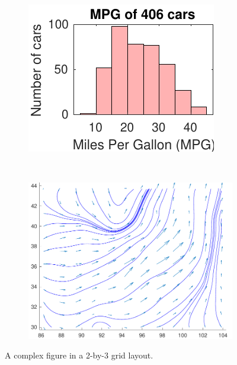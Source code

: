 \begin{figure}[H]
		\hfill
		\begin{subfigure}[b]{\threefig\textwidth}
			\centering
			\includegraphics{../matlab/fig/examples/hist-with-ffsp.pdf}
		\end{subfigure}
		\\
		\begin{subfigure}[b]{\onefig\textwidth}
			\centering
			\includegraphics{../matlab/fig/examples/stream-with-ffsp.pdf}
		\end{subfigure}
		\caption{A complex figure in a \num{2}-by-\num{3} grid layout. \label{fig:2-by-3}}
	\end{figure}
	
